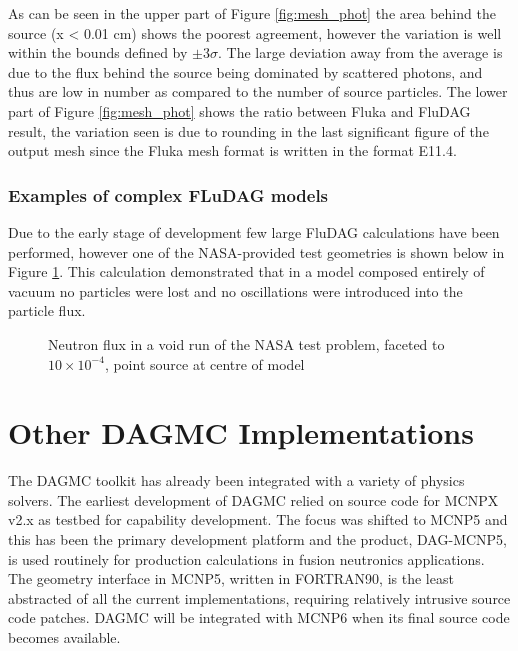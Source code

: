 \documentclass{anstrans}[12pt]
\begin{document}
As can be seen in the upper part of Figure \ref{fig:mesh_phot} the area behind the source 
(x < 0.01 cm) shows the poorest agreement, however the variation is well within the 
bounds defined by $\pm 3\sigma$. The large deviation away from the average is due to 
the flux behind the source being dominated by scattered photons, and thus are low in 
number as compared to the number of source particles.  The lower part of Figure 
\ref{fig:mesh_phot} shows the ratio between Fluka and FluDAG result, the variation seen is 
due to rounding in the last significant figure of the output mesh since the Fluka mesh format is written 
 in the format E11.4. 

\subsubsection{Examples of complex FLuDAG models}
Due to the early stage of development few large FluDAG calculations have been performed, however
one of the NASA-provided test geometries is shown below in Figure \ref{nasa_mesh}.  This calculation demonstrated 
that in a model composed entirely of vacuum no particles were lost and no oscillations were
introduced into the particle flux.

\begin{figure}%
        \begin{center}
                \caption{Neutron flux in a void run of the NASA test problem, 
                         faceted to $10\times10^{-4}$, point source at centre of model}\label{nasa_mesh}
        \end{center}
\end{figure}

\section{Other DAGMC Implementations}

The DAGMC toolkit has already been integrated with a variety of
physics solvers.  The earliest development of DAGMC relied on source
code for MCNPX v2.x as testbed for capability development.  The focus
was shifted to MCNP5 and this has been the primary development
platform and the product, DAG-MCNP5, is used routinely for production
calculations in fusion neutronics applications.  The geometry
interface in MCNP5, written in FORTRAN90, is the least abstracted of
all the current implementations, requiring relatively intrusive source
code patches.  DAGMC will be integrated with MCNP6 when its final source
code becomes available.
\end{document}
